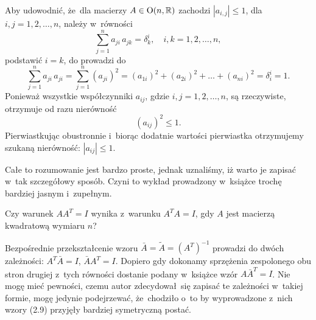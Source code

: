 \documentclass[a4paper,11pt]{article}
\begin{document}
\vspace{\spaceFour}





\start {} Aby udowodnić, że~dla macierzy $A \in \mathrm{O}( n, \mathbb{R} )$
zachodzi $| a_{ i, j } | \leq 1$, dla $i, j = 1, 2, \ldots, n$, należy w~równości
\begin{equation}
  \label{eq:Wojtynski-04}
  \sum_{ j = 1 }^{ n } a_{ j i } \, a_{ j k } = \delta_{ k }^{ i }, \quad
  i, k = 1, 2, \ldots, n,
\end{equation}
podstawić $i = k$, do prowadzi do
\begin{equation}
  \label{eq:Wojtynski-05}
  \sum_{ j = 1 }^{ n } a_{ j i } \, a_{ j i } =
  \sum_{ j = 1 }^{ n } ( a_{ j i } )^{ 2 } =
  ( a_{ 1 i } )^{ 2 } + ( a_{ 2 i } )^{ 2 } + \ldots + ( a_{ n i } )^{ 2 } =
  \delta^{ i }_{ i } = 1.
\end{equation}
Ponieważ wszystkie współczynniki $a_{ i j }$, gdzie $i, j = 1, 2, \ldots, n$, są
rzeczywiste, otrzymuje od razu nierówność
\begin{equation}
  \label{eq:Wojtynski-06}
  ( a_{ i j } )^{ 2 } \leq 1.
\end{equation}
Pierwiastkując obustronnie i~biorąc dodatnie wartości pierwiastka
otrzymujemy szukaną nierówność: $| a_{ i j } | \leq 1$.

Całe to rozumowanie jest bardzo proste, jednak uznaliśmy, iż warto je
zapisać w~tak szczegółowy sposób. Czyni to wykład prowadzony w~książce
trochę bardziej jasnym i~zupełnym.

\vspace{\spaceFour}





\start {} Czy warunek $A A^{ T } = I$ wynika z~warunku $A^{ T } A = I$,
gdy $A$ jest macierzą kwadratową wymiaru $n$?

\vspace{\spaceFour}





\start {} Bezpośrednie przekształcenie wzoru
$\bar{A} = \widetilde{A} = ( A^{ T } )^{ -1 }$ prowadzi do dwóch zależności:
$A^{ T } \bar{A} = I$, $\bar{A} A^{ T } = I$. Dopiero gdy dokonamy sprzężenia
zespolonego obu stron drugiej z~tych równości dostanie podany w~książce wzór
$A \bar{A}^{ T } = I$. Nie mogę mieć pewności, czemu autor zdecydował~się
zapisać te zależności w~takiej formie, mogę jedynie podejrzewać, że~chodziło
o~to by wyprowadzone z~nich wzory (2.9) przyjęły bardziej symetryczną postać.
\end{document}
